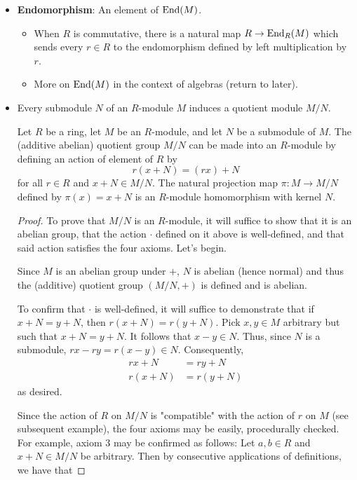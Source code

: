 \documentclass[../notes.tex]{subfiles}
\begin{document}
\begin{itemize}
\begin{equation*}
    \end{equation*}
    \item \textbf{Endomorphism}: An element of $\operatorname{End}(M)$.
    \begin{itemize}
        \item When $R$ is commutative, there is a natural map $R\to\operatorname{End}_R(M)$ which sends every $r\in R$ to the endomorphism defined by left multiplication by $r$.
        \item More on $\operatorname{End}(M)$ in the context of algebras (return to later).
    \end{itemize}
    \item Every submodule $N$ of an $R$-module $M$ induces a quotient module $M/N$.
    \begin{proposition}\label{prp:10.3}
        Let $R$ be a ring, let $M$ be an $R$-module, and let $N$ be a submodule of $M$. The (additive abelian) quotient group $M/N$ can be made into an $R$-module by defining an action of element of $R$ by
        \begin{equation*}
            r(x+N) = (rx)+N
        \end{equation*}
        for all $r\in R$ and $x+N\in M/N$. The natural projection map $\pi:M\to M/N$ defined by $\pi(x)=x+N$ is an $R$-module homomorphism with kernel $N$.
        \begin{proof}
            To prove that $M/N$ is an $R$-module, it will suffice to show that it is an abelian group, that the action $\cdot$ defined on it above is well-defined, and that said action satisfies the four axioms. Let's begin.\par
            Since $M$ is an abelian group under $+$, $N$ is abelian (hence normal) and thus the (additive) quotient group $(M/N,+)$ is defined and is abelian.\par
            To confirm that $\cdot$ is well-defined, it will suffice to demonstrate that if $x+N=y+N$, then $r(x+N)=r(y+N)$. Pick $x,y\in M$ arbitrary but such that $x+N=y+N$. It follows that $x-y\in N$. Thus, since $N$ is a submodule, $rx-ry=r(x-y)\in N$. Consequently,
            \begin{align*}
                rx+N &= ry+N\\
                r(x+N) &= r(y+N)
            \end{align*}
            as desired.\par
            Since the action of $R$ on $M/N$ is "compatible" with the action of $r$ on $M$ (see subsequent example), the four axioms may be easily, procedurally checked. For example, axiom 3 may be confirmed as follows: Let $a,b\in R$ and $x+N\in M/N$ be arbitrary. Then by consecutive applications of definitions, we have that

\end{proof}
\end{proposition}
\end{itemize}
\end{document}
